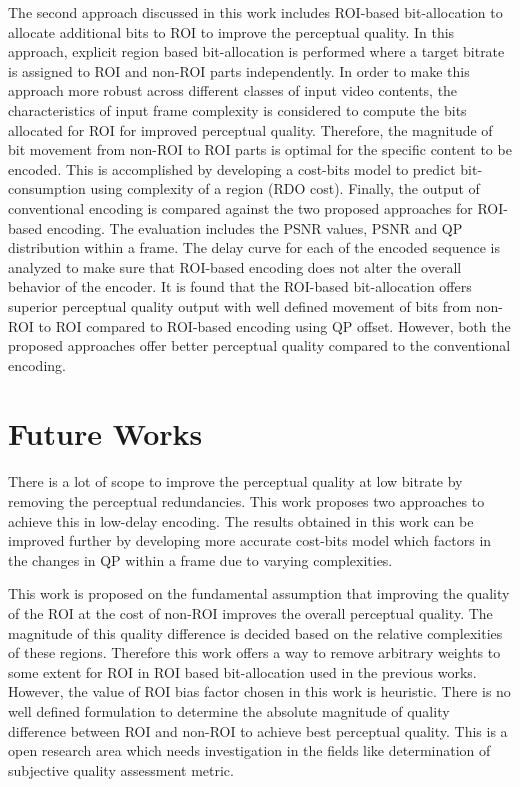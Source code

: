 The second approach discussed in this work includes ROI-based bit-allocation to allocate additional bits to ROI to improve the perceptual quality. In this approach, explicit region based bit-allocation is performed where a target bitrate is assigned to ROI and non-ROI parts independently. In order to make this approach more robust across different classes of input video contents, the characteristics of input frame complexity is considered to compute the bits allocated for ROI for improved perceptual quality. Therefore, the magnitude of bit movement from non-ROI to ROI parts is optimal for the specific content to be encoded. This is accomplished by developing a cost-bits model to predict bit-consumption using complexity of a region (RDO cost). Finally, the output of conventional encoding is compared against the two proposed approaches for ROI-based encoding. The evaluation includes the PSNR values, PSNR and QP distribution within a frame. The delay curve for each of the encoded sequence is analyzed to make sure that ROI-based encoding does not alter the overall behavior of the encoder. It is found that the ROI-based bit-allocation offers superior perceptual quality output with well defined movement of bits from non-ROI to ROI compared to ROI-based encoding using QP offset. However, both the proposed approaches offer better perceptual quality compared to the conventional encoding.

\section{Future Works}
There is a lot of scope to improve the perceptual quality at low bitrate by removing the perceptual redundancies. This work proposes two approaches to achieve this in low-delay encoding. The results obtained in this work can be improved further by developing more accurate cost-bits model which factors in the changes in QP within a frame due to varying complexities. 

This work is proposed on the fundamental assumption that improving the quality of the ROI at the cost of non-ROI improves the overall perceptual quality. The magnitude of this quality difference is decided based on the relative complexities of these regions. Therefore this work offers a way to remove arbitrary weights to some extent for ROI in ROI based bit-allocation used in the previous works. However, the value of ROI bias factor chosen in this work is heuristic. There is no well defined formulation to determine the absolute magnitude of quality difference between ROI and non-ROI to achieve best perceptual quality. This is a open research area which needs investigation in the fields like determination of subjective quality assessment metric.